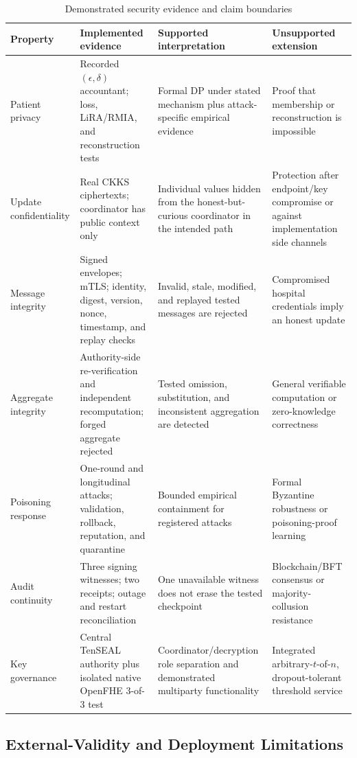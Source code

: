 \documentclass[conference]{IEEEtran}
\begin{document}
\begin{table}[t]
\caption{Demonstrated security evidence and claim boundaries}
\label{tab:paper-security-boundaries}
\centering
\scriptsize
\setlength{\tabcolsep}{4pt}
\renewcommand{\arraystretch}{1.1}
\begin{tabular}{@{}p{2.7cm}p{5.3cm}p{4.1cm}p{4.4cm}@{}}
\toprule
Property & Implemented evidence & Supported interpretation & Unsupported extension \\
\midrule
Patient privacy & Recorded $(\epsilon,\delta)$ accountant; loss, LiRA/RMIA, and reconstruction tests & Formal DP under stated mechanism plus attack-specific empirical evidence & Proof that membership or reconstruction is impossible \\
Update confidentiality & Real CKKS ciphertexts; coordinator has public context only & Individual values hidden from the honest-but-curious coordinator in the intended path & Protection after endpoint/key compromise or against implementation side channels \\
Message integrity & Signed envelopes; mTLS; identity, digest, version, nonce, timestamp, and replay checks & Invalid, stale, modified, and replayed tested messages are rejected & Compromised hospital credentials imply an honest update \\
Aggregate integrity & Authority-side re-verification and independent recomputation; forged aggregate rejected & Tested omission, substitution, and inconsistent aggregation are detected & General verifiable computation or zero-knowledge correctness \\
Poisoning response & One-round and longitudinal attacks; validation, rollback, reputation, and quarantine & Bounded empirical containment for registered attacks & Formal Byzantine robustness or poisoning-proof learning \\
Audit continuity & Three signing witnesses; two receipts; outage and restart reconciliation & One unavailable witness does not erase the tested checkpoint & Blockchain/BFT consensus or majority-collusion resistance \\
Key governance & Central TenSEAL authority plus isolated native OpenFHE 3-of-3 test & Coordinator/decryption role separation and demonstrated multiparty functionality & Integrated arbitrary-$t$-of-$n$, dropout-tolerant threshold service \\
\bottomrule
\end{tabular}
\end{table}

\subsection{External-Validity and Deployment Limitations}
\end{document}
